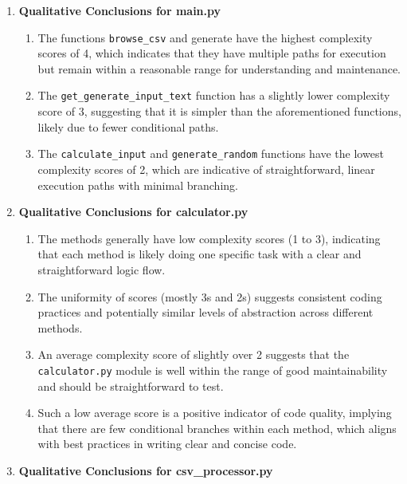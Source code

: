 \begin{enumerate}
\item \textbf{Qualitative Conclusions for main.py}\\

\begin{enumerate}
    \item The functions \texttt{browse\_csv} and generate have the highest complexity scores of 4, which indicates that they have multiple paths for execution but remain within a reasonable range for understanding and maintenance.
    \item The \texttt{get\_generate\_input\_text} function has a slightly lower complexity score of 3, suggesting that it is simpler than the aforementioned functions, likely due to fewer conditional paths. 
    \item The \texttt{calculate\_input} and \texttt{generate\_random} functions have the lowest complexity scores of 2, which are indicative of straightforward, linear execution paths with minimal branching.
\end{enumerate}

\item \textbf{Qualitative Conclusions for calculator.py}\\

\begin{enumerate}
    \item The methods generally have low complexity scores (1 to 3), indicating that each method is likely doing one specific task with a clear and straightforward logic flow. 
    \item The uniformity of scores (mostly 3s and 2s) suggests consistent coding practices and potentially similar levels of abstraction across different methods.
    \item An average complexity score of slightly over 2 suggests that the \texttt{calculator.py} module is well within the range of good maintainability and should be straightforward to test.
    \item Such a low average score is a positive indicator of code quality, implying that there are few conditional branches within each method, which aligns with best practices in writing clear and concise code.
\end{enumerate}

\item \textbf{Qualitative Conclusions for csv\_processor.py}\\


\end{enumerate}
